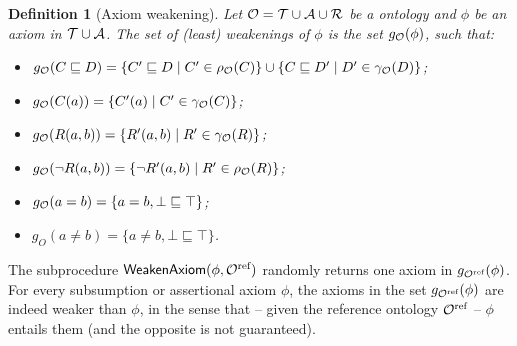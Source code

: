 \documentclass[
]{ceurart}
\newtheorem{definition}{Definition}
\begin{document}


\begin{definition}[Axiom weakening]\label{def:axiom-weakening}
Let $\mathcal{O} = \mathcal{T} \cup \mathcal{A} \cup \mathcal{R}$ be a \SROIQ ontology and $\phi$ be an axiom in $\mathcal{T} \cup \mathcal{A}$. The set of (least) \emph{weakenings} of $\phi$ is the set $g_{\mathcal{O}}(\phi)$, such that:
\begin{itemize}
    \item $g_{\mathcal{O}}(C \sqsubseteq D) = \{C'\sqsubseteq D \mid  C' \in \rho_{\mathcal{O}}(C) \} \cup \{C\sqsubseteq D' \mid D' \in \gamma_\mathcal{O}(D)\}$;
    \item $g_{\mathcal{O}}(C(a)) = \{C'(a) \mid C' \in \gamma_\mathcal{O}(C)\}$;
    \item $g_{\mathcal{O}}(R(a,b)) = \{ R'(a,b) \mid R' \in \gamma_\mathcal{O}(R) \}$;
    \item $g_{\mathcal{O}}(\lnot R(a,b)) = \{\lnot R'(a,b) \mid R' \in \rho_\mathcal{O}(R)\}$;
    \item $g_\mathcal{O}(a =b) = \{a = b, \bot \sqsubseteq \top \}$;
    \item $g_O(a \not = b) = \{a \not = b, \bot \sqsubseteq \top \}$.
\end{itemize}

\end{definition}

The subprocedure $\textsf{WeakenAxiom}(\phi, \mathcal{O}^\text{ref})$ randomly returns one axiom in $g_{\mathcal{O}^\text{ref}}(\phi)$.
%
For every subsumption or assertional axiom $\phi$, the axioms in the set $g_{\mathcal{O}^\text{ref}}(\phi)$ are indeed weaker than $\phi$, in the sense that -- given the reference ontology $\mathcal{O}^\text{ref}$ -- $\phi$ entails them (and the opposite is not guaranteed). 
\end{document}
